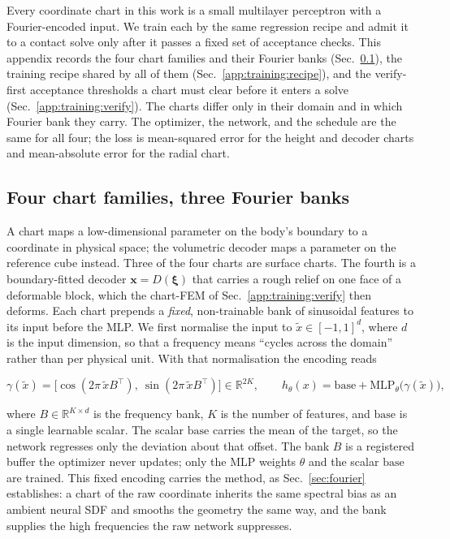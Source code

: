 \documentclass{svjour3}                 %
\newcommand{\R}{\mathbb{R}}
\newcommand{\xbf}{\bm{x}}
\begin{document}
\begin{appendix}
Every coordinate chart in this work is a small multilayer perceptron with a Fourier-encoded input. We train each by the same regression recipe and admit it to a contact solve only after it passes a fixed set of acceptance checks. This appendix records the four chart families and their Fourier banks (Sec.~\ref{app:training:families}), the training recipe shared by all of them (Sec.~\ref{app:training:recipe}), and the verify-first acceptance thresholds a chart must clear before it enters a solve (Sec.~\ref{app:training:verify}). The charts differ only in their domain and in which Fourier bank they carry. The optimizer, the network, and the schedule are the same for all four; the loss is mean-squared error for the height and decoder charts and mean-absolute error for the radial chart.

\subsection{Four chart families, three Fourier banks}\label{app:training:families}

A chart maps a low-dimensional parameter on the body's boundary to a coordinate in physical space; the volumetric decoder maps a parameter on the reference cube instead. Three of the four charts are surface charts. The fourth is a boundary-fitted decoder $\xbf=D(\bm\xi)$ that carries a rough relief on one face of a deformable block, which the chart-FEM of Sec.~\ref{app:training:verify} then deforms. Each chart prepends a \emph{fixed}, non-trainable bank of sinusoidal features to its input before the MLP. We first normalise the input to $\tilde x\in[-1,1]^d$, where $d$ is the input dimension, so that a frequency means ``cycles across the domain'' rather than per physical unit. With that normalisation the encoding reads

\begin{equation}\label{eq:appB-fourier}
\gamma(\tilde x)=\big[\cos(2\pi\,\tilde x B^{\!\top}),\ \sin(2\pi\,\tilde x B^{\!\top})\big]\in\R^{2K},
\qquad
h_\theta(x)=\mathrm{base}+\mathrm{MLP}_\theta\!\big(\gamma(\tilde x)\big),
\end{equation}

where $B\in\R^{K\times d}$ is the frequency bank, $K$ is the number of features, and $\mathrm{base}$ is a single learnable scalar. The scalar $\mathrm{base}$ carries the mean of the target, so the network regresses only the deviation about that offset. The bank $B$ is a registered buffer the optimizer never updates; only the MLP weights $\theta$ and the scalar $\mathrm{base}$ are trained. This fixed encoding carries the method, as Sec.~\ref{sec:fourier} establishes: a chart of the raw coordinate inherits the same spectral bias as an ambient neural SDF and smooths the geometry the same way, and the bank supplies the high frequencies the raw network suppresses.


\end{appendix}
\end{document}
